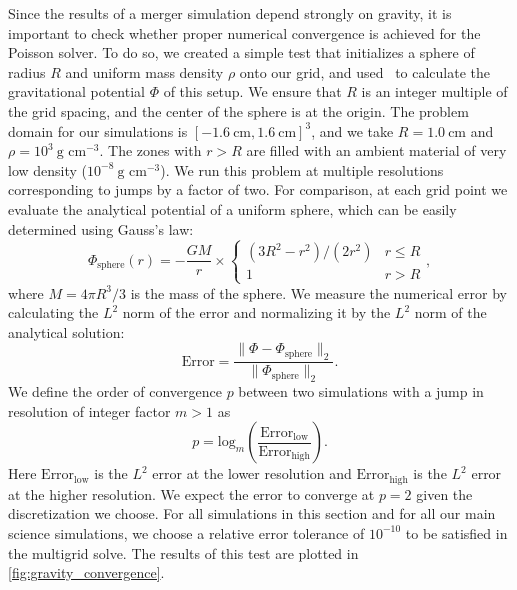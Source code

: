 \documentclass[12pt]{article}
\begin{document}
Since the results of a merger simulation depend strongly on gravity,
it is important to check whether proper numerical convergence is
achieved for the Poisson solver. To do so, we created a simple test
that initializes a sphere of radius $R$ and uniform mass density $\rho$
onto our grid, and used \castro\ to calculate the gravitational
potential $\Phi$ of this setup. We ensure that $R$ is an integer
multiple of the grid spacing, and the center of the sphere is at the
origin. The problem domain for our simulations is $[-1.6\ \text{cm}, 1.6\ \text{cm}]^3$, and
we take $R = 1.0\ \text{cm}$ and $\rho = 10^3\ \text{g cm}^{-3}$.
The zones with $r > R$ are filled with an ambient material of very low density
($10^{-8}\ \text{g cm}^{-3}$). We run this problem at multiple
resolutions corresponding to jumps by a factor of two. For
comparison, at each grid point we evaluate the analytical potential of
a uniform sphere, which can be easily determined using Gauss's law:
\begin{equation}
  \Phi_{\text{sphere}}(r) = -\frac{GM}{r} \times \begin{cases} (3R^2 - r^2)/(2 r^2) & r \leq R \\ 1 & r > R \end{cases},\label{eq:sphere-analytical}
\end{equation}
where $M = 4\pi R^3 / 3$ is the mass of the sphere. We measure the
numerical error by calculating the $L^2$ norm of the error and
normalizing it by the $L^2$ norm of the analytical solution:
\begin{equation}
  \text{Error} = \frac{\|\Phi - \Phi_{\text{sphere}}\|_2}{\|\Phi_{\text{sphere}}\|_2}.
\end{equation}
We define the order of convergence $p$ between two simulations with a jump
in resolution of integer factor $m > 1$ as
\begin{equation}
  p = \text{log}_{m}\left(\frac{\text{Error}_{\text{low}}}{\text{Error}_{\text{high}}}\right).
\end{equation}
Here $\text{Error}_{\text{low}}$ is the $L^2$ error at the lower resolution
and $\text{Error}_{\text{high}}$ is the $L^2$ error at the higher resolution.
We expect the error to converge at $p = 2$ given the discretization we choose.
For all simulations in this section and for all our main science simulations,
we choose a relative error tolerance of $10^{-10}$ to be satisfied in the multigrid solve.
The results of this test are plotted in \autoref{fig:gravity_convergence}.
\end{document}

